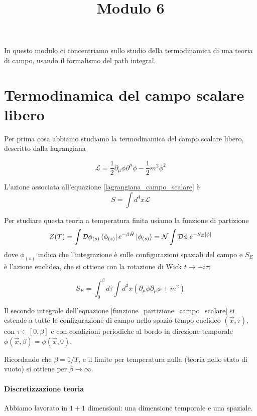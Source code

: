 \documentclass[a4paper, 12pt]{article}
\title{Modulo 6}
\begin{document}
\maketitle
In questo modulo ci concentriamo sullo studio della termodinamica di una teoria
di campo, usando il formalismo del path integral.

\section{Termodinamica del campo scalare libero}
Per prima cosa abbiamo studiamo la termodinamica del campo scalare libero,
descritto dalla lagrangiana

\begin{equation}
\mathcal{L} = \frac{1}{2}\partial_{\mu}\phi \partial^{\mu}\phi - \frac{1}{2}m^2 \phi^2
\label{lagrangiana_campo_scalare}
\end{equation}

L'azione associata all'equazione \ref{lagrangiana_campo_scalare} è
\begin{equation}
S=\int d^4x \mathcal{L}
\end{equation}

Per studiare questa teoria a temperatura finita usiamo la funzione di partizione
\begin{equation}
Z(T) = \int \mathcal{D} \phi_{(s)} \bra{\phi_{(s)}} e^{-\beta \hat{H}}
        \ket{\phi_{(s)}} = \mathcal{N} \int \mathcal{D}\phi \; e^{-S_E[\phi]}
\label{funzione_partizione_campo_scalare}
\end{equation}
dove $\phi_{(s)}$ indica che l'integrazione è sulle configurazioni spaziali
del campo e $S_E$ è l'azione euclidea, che si ottiene con la rotazione di Wick
$t \rightarrow -i\tau$:

\begin{equation}
S_E = \int_0^\beta d\tau \int d^3x (\partial_{\mu}\phi \partial_{\mu}\phi + m^2)
\end{equation}

Il secondo integrale dell'equazione \ref{funzione_partizione_campo_scalare} si
estende a tutte le configurazione di campo nello spazio-tempo euclideo $(\vec{x}, \tau)$,
con $\tau \in [0, \beta]$ e con condizioni periodiche al bordo in direzione temporale
$\phi(\vec{x}, \beta) = \phi(\vec{x}, 0)$.

Ricordando che $\beta = 1 / T$, e il limite per temperatura nulla (teoria nello
stato di vuoto) si ottiene per $\beta \rightarrow \infty$.

\paragraph{Discretizzazione teoria}
Abbiamo lavorato in $1 + 1$ dimensioni: una dimensione temporale e una
spaziale.
\end{document}
